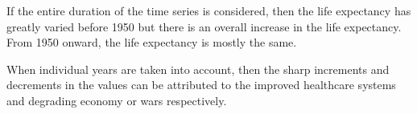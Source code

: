\noindent If the entire duration of the time series is considered, then the life expectancy has greatly varied before 1950 but there is an overall increase in the life expectancy. From 1950 onward, the life expectancy is mostly the same. 

\noindent When individual years are taken into account, then the sharp increments and decrements in the values can be attributed to the improved healthcare systems and degrading economy or wars respectively.